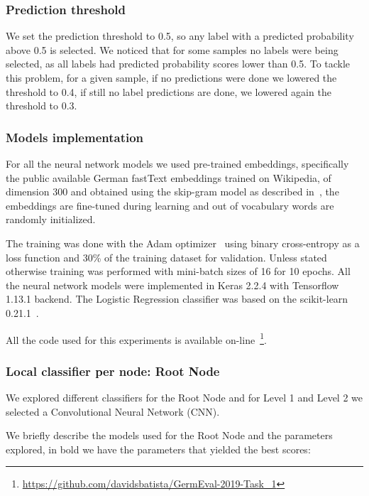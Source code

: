 \documentclass[11pt,a4paper]{article}
\begin{document}
\subsubsection{Prediction threshold}\label{threshold}

We set the prediction threshold to 0.5, so any label with a predicted probability
above 0.5 is selected. We noticed that for some samples no labels were
being selected, as all labels had predicted probability scores lower than 0.5.
To tackle this problem, for a given sample, if no predictions were done we lowered
the threshold to 0.4, if still no label predictions are done, we lowered again
the threshold to 0.3.


\subsubsection{Models implementation}

For all the neural network models we used pre-trained embeddings, specifically
the public available German fastText embeddings trained on Wikipedia, of
dimension 300 and obtained using the skip-gram model as described
in~\citet{bojanowski-etal-2017-enriching}, the embeddings are fine-tuned
during learning and out of vocabulary words are randomly initialized.

The training was done with the Adam optimizer~\cite{journals/corr/KingmaB14}
using binary cross-entropy as a loss function and 30\% of the training
dataset for validation. Unless stated otherwise training was performed with
mini-batch sizes of 16 for 10 epochs. All the neural network models were implemented in
Keras 2.2.4 with Tensorflow 1.13.1 backend. The Logistic Regression classifier
was based on the scikit-learn 0.21.1~\cite{Pedregosa:2011:SML:1953048.2078195}.

All the code used for this experiments is available
on-line~\footnote{\url{https://github.com/davidsbatista/GermEval-2019-Task_1}}.


\subsubsection{Local classifier per node: Root Node}

We explored different classifiers for the Root Node and for Level 1 and Level 2 we
selected a Convolutional Neural Network (CNN).

We briefly describe the models used for the Root Node and the parameters explored,
in bold we have the parameters that yielded the best scores:
\end{document}
